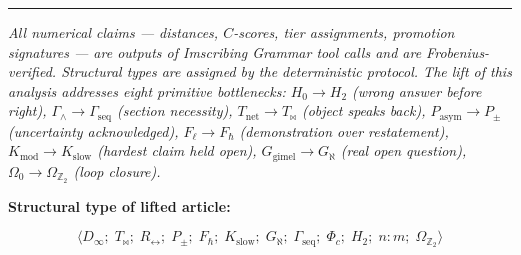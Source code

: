 \documentclass[12pt,a4paper]{article}
\begin{document}
\begin{center}
\rule{0.5\textwidth}{0.4pt}
\end{center}

\emph{All numerical claims --- distances, $C$-scores, tier assignments, promotion signatures --- are outputs of Imscribing Grammar tool calls and are Frobenius-verified. Structural types are assigned by the deterministic protocol. The lift of this analysis addresses eight primitive bottlenecks: $H_0 \to H_2$ (wrong answer before right), $\Gamma_{\land} \to \Gamma_\text{seq}$ (section necessity), $T_\text{net} \to T_{\bowtie}$ (object speaks back), $P_\text{asym} \to P_{\pm}$ (uncertainty acknowledged), $F_{\ell} \to F_{\hbar}$ (demonstration over restatement), $K_\text{mod} \to K_\text{slow}$ (hardest claim held open), $G_\text{gimel} \to G_{\aleph}$ (real open question), $\Omega_0 \to \Omega_{\mathbb{Z}_2}$ (loop closure).}

\textbf{Structural type of lifted article:}


\[\langle D_{\infty};\; T_{\bowtie};\; R_{\leftrightarrow};\; P_{\pm};\; F_{\hbar};\; K_\text{slow};\; G_{\aleph};\; \Gamma_\text{seq};\; \Phi_c;\; H_2;\; n{:}m;\; \Omega_{\mathbb{Z}_2} \rangle\]
\end{document}
